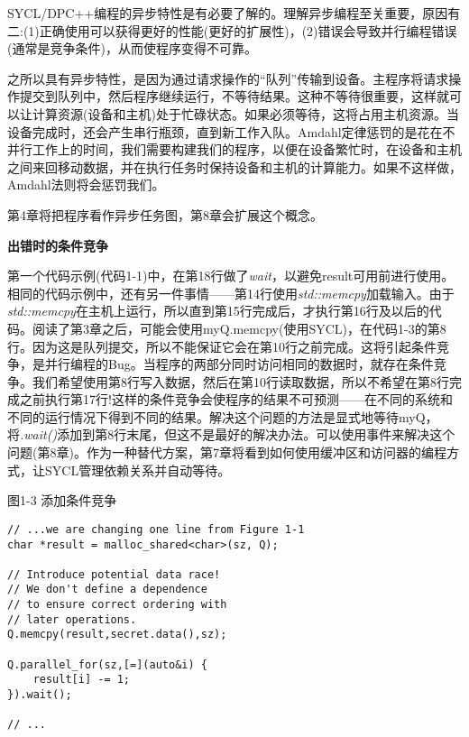 SYCL/DPC++编程的异步特性是有必要了解的。理解异步编程至关重要，原因有二:(1)正确使用可以获得更好的性能(更好的扩展性)，(2)错误会导致并行编程错误(通常是竞争条件)，从而使程序变得不可靠。\par

之所以具有异步特性，是因为通过请求操作的“队列”传输到设备。主程序将请求操作提交到队列中，然后程序继续运行，不等待结果。这种不等待很重要，这样就可以让计算资源(设备和主机)处于忙碌状态。如果必须等待，这将占用主机资源。当设备完成时，还会产生串行瓶颈，直到新工作入队。Amdahl定律惩罚的是花在不并行工作上的时间，我们需要构建我们的程序，以便在设备繁忙时，在设备和主机之间来回移动数据，并在执行任务时保持设备和主机的计算能力。如果不这样做，Amdahl法则将会惩罚我们。\par

第4章将把程序看作异步任务图，第8章会扩展这个概念。\par

\hspace*{\fill} \par %
\textbf{出错时的条件竞争}

第一个代码示例(代码1-1)中，在第18行做了\textit{wait}，以避免result可用前进行使用。相同的代码示例中，还有另一件事情——第14行使用\textit{std::memcpy}加载输入。由于\textit{std::memcpy}在主机上运行，所以直到第15行完成后，才执行第16行及以后的代码。阅读了第3章之后，可能会使用myQ.memcpy(使用SYCL)，在代码1-3的第8行。因为这是队列提交，所以不能保证它会在第10行之前完成。这将引起条件竞争，是并行编程的Bug。当程序的两部分同时访问相同的数据时，就存在条件竞争。我们希望使用第8行写入数据，然后在第10行读取数据，所以不希望在第8行完成之前执行第17行!这样的条件竞争会使程序的结果不可预测——在不同的系统和不同的运行情况下得到不同的结果。解决这个问题的方法是显式地等待myQ，将\textit{.wait()}添加到第8行末尾，但这不是最好的解决办法。可以使用事件来解决这个问题(第8章)。作为一种替代方案，第7章将看到如何使用缓冲区和访问器的编程方式，让SYCL管理依赖关系并自动等待。\par

图1-3 添加条件竞争
\begin{lstlisting}[caption={}]
// ...we are changing one line from Figure 1-1
char *result = malloc_shared<char>(sz, Q);

// Introduce potential data race!
// We don't define a dependence
// to ensure correct ordering with
// later operations.
Q.memcpy(result,secret.data(),sz);

Q.parallel_for(sz,[=](auto&i) {
	result[i] -= 1;
}).wait();

// ...
\end{lstlisting}

